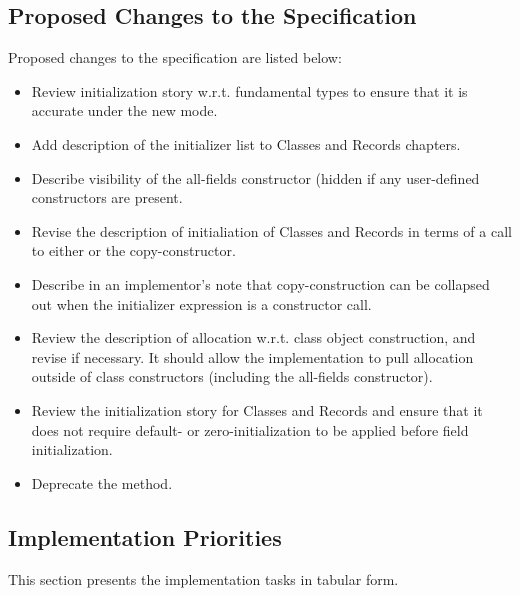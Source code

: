 \subsection{Proposed Changes to the Specification}

Proposed changes to the specification are listed below:
\begin{itemize}
\item Review initialization story w.r.t. fundamental types to ensure that it is accurate
  under the new mode.
\item Add description of the initializer list to Classes and Records chapters.
\item Describe visibility of the all-fields constructor (hidden if any user-defined
  constructors are present.
\item Revise the description of initialiation of Classes and Records in terms of a call to
  either  or the copy-constructor.
\item Describe in an implementor's note that copy-construction can be collapsed out when
  the initializer expression is a constructor call.
\item Review the description of allocation w.r.t. class object construction, and revise if
  necessary.  It should allow the implementation to pull allocation outside of class
  constructors (including the all-fields constructor).
\item Review the initialization story for Classes and Records and ensure that it does not
  require default- or zero-initialization to be applied before field initialization.
\item Deprecate the  method.
\end{itemize}

\subsection{Implementation Priorities}

This section presents the implementation tasks in tabular form.

